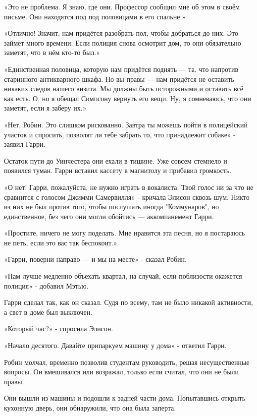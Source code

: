 \documentclass[a4paper,12pt]{book}
\begin{document}
\par
«Это не проблема. Я знаю, где они. Профессор сообщил мне об этом в своём письме. Они находятся под под половицами в его спальне.»
\par
«Отлично! Значит, нам придётся разобрать пол, чтобы добраться до них. Это займёт много времени. Если полиция снова осмотрит дом, то они обязательно заметят, что в нём кто-то был.»
\par
«Единственная половица, которую нам придётся поднять — та, что напротив старинного антикварного шкафа. Но вы правы — нам придётся не оставить никаких следов нашего визита. Мы должны быть осторожными и оставить всё как есть. О, но я обещал Симпсону вернуть его вещи. Ну, я сомневаюсь, что они заметят, если я заберу их.»
\par
«Нет, Робин. Это слишком рискованно. Завтра ты можешь пойти в полицейский участок и спросить, позволят ли тебе забрать то, что принадлежит собаке» - заявил Гарри.\\
\par
Остаток пути до Уинчестера они ехали в тишине. Уже совсем стемнело и появился туман. Гарри вставил кассету в магнитолу и прибавил громкость.
\par
«О нет! Гарри, пожалуйста, не нужно играть в вокалиста. Твой голос ни за что не сравнится с голосом Джимми Самервилля» - кричала Элисон сквозь шум. Никто из них не был против того, чтобы послушать иногда "Коммунаров", но единственное, без чего они могли обойтись — аккомпанемент Гарри.
\par
«Простите, ничего не могу поделать. Мне нравится эта песня, но я постараюсь не петь, если это вас так беспокоит.»
\par
«Гарри, поверни направо — и мы на месте» - сказал Робин.
\par
«Нам лучше медленно объехать квартал, на случай, если поблизости окажется полиция» - добавил Мэтью.
\par
Гарри сделал так, как он сказал. Судя по всему, там не было никакой активности, а свет в доме был выключен.
\par
«Который час?» - спросила Элисон.
\par
«Начало десятого. Давайте припаркуем машину у дома» - ответил Гарри.
\par
Робин молчал, временно позволив студентам руководить, решая несущественные вопросы. Он вмешивался или возражал, только если считал, что они не были правы.
\par
Они вышли из машины и подошли к задней части дома. Попытавшись открыть кухонную дверь, они обнаружили, что она была заперта.
\end{document}
